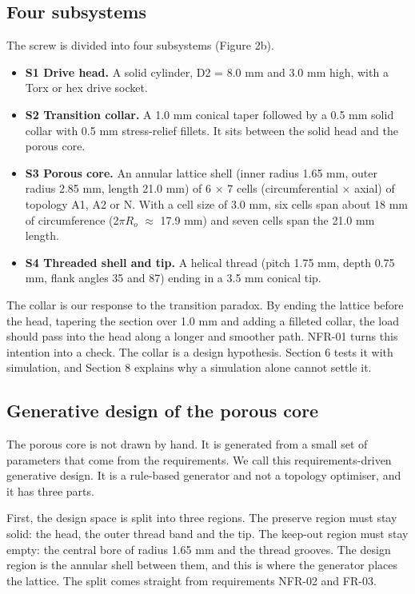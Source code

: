 \documentclass[10pt,twocolumn,letterpaper]{article}
\begin{document}
\subsection{Four subsystems}
The screw is divided into four subsystems (Figure 2b).

\begin{itemize}
\item \textbf{S1 Drive head.} A solid cylinder, D2 = 8.0 mm and 3.0 mm high, with a Torx or hex drive socket.
\item \textbf{S2 Transition collar.} A 1.0 mm conical taper followed by a 0.5 mm solid collar with 0.5 mm stress-relief fillets. It sits between the solid head and the porous core.
\item \textbf{S3 Porous core.} An annular lattice shell (inner radius 1.65 mm, outer radius 2.85 mm, length 21.0 mm) of 6 $\times$ 7 cells (circumferential $\times$ axial) of topology A1, A2 or N. With a cell size of 3.0 mm, six cells span about 18 mm of circumference (2$\pi$$R_{o}$ $\approx$ 17.9 mm) and seven cells span the 21.0 mm length.
\item \textbf{S4 Threaded shell and tip.} A helical thread (pitch 1.75 mm, depth 0.75 mm, flank angles 35\textdegree{} and 87\textdegree{}) ending in a 3.5 mm conical tip.
\end{itemize}
The collar is our response to the transition paradox. By ending the lattice before the head, tapering the section over 1.0 mm and adding a filleted collar, the load should pass into the head along a longer and smoother path. NFR-01 turns this intention into a check. The collar is a design hypothesis. Section 6 tests it with simulation, and Section 8 explains why a simulation alone cannot settle it.

\subsection{Generative design of the porous core}
The porous core is not drawn by hand. It is generated from a small set of parameters that come from the requirements. We call this requirements-driven generative design. It is a rule-based generator and not a topology optimiser, and it has three parts.

First, the design space is split into three regions. The preserve region must stay solid: the head, the outer thread band and the tip. The keep-out region must stay empty: the central bore of radius 1.65 mm and the thread grooves. The design region is the annular shell between them, and this is where the generator places the lattice. The split comes straight from requirements NFR-02 and FR-03.
\end{document}
